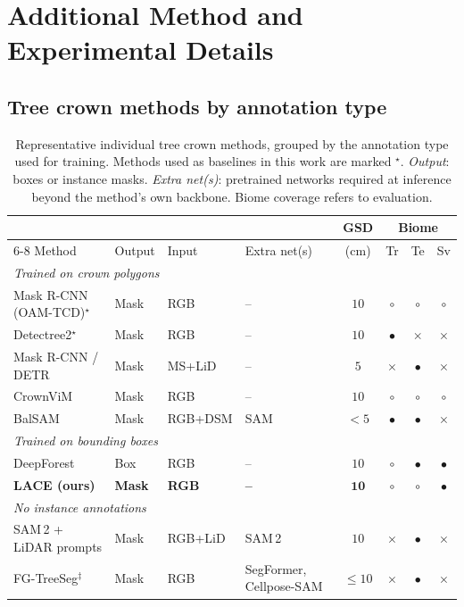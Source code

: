 \documentclass[remotesensing,article,submit,moreauthors]{Definitions/mdpi}
\providecommand{\cmark}{$\bullet$}
\providecommand{\omark}{$\circ$}
\providecommand{\xmark}{$\times$}
\begin{document}
\appendixstart
\appendix
\section{Additional Method and Experimental Details}
\label{app:details}

\subsection{Tree crown methods by annotation type}
\label{app:gap}

\begin{table}[H]
\centering\footnotesize
\setlength{\tabcolsep}{3.2pt}
\renewcommand{\arraystretch}{1.15}
\caption{Representative individual tree crown methods, grouped by the annotation type used for training. Methods used as baselines in this work are marked $^{\star}$. \emph{Output}: boxes or instance masks. \emph{Extra net(s)}: pretrained networks required at inference beyond the method's own backbone. Biome coverage refers to evaluation.}
\label{tab:gap}
\begin{tabular}{@{}llllcccc@{}}
\toprule
 & & & & GSD & \multicolumn{3}{c}{Biome} \\
\cmidrule(l){6-8}
Method & Output & Input & Extra net(s) & (cm) & Tr & Te & Sv \\
\midrule
\multicolumn{8}{l}{\textit{Trained on crown polygons}} \\
Mask R-CNN (OAM-TCD)$^{\star}$ \cite{oamtcd} & Mask & RGB & -- & $10$ & \omark & \omark & \omark \\
Detectree2$^{\star}$ \cite{ball2023} & Mask & RGB & -- & $10$ & \cmark & \xmark & \xmark \\
Mask R-CNN / DETR \cite{dersch2023} & Mask & MS+LiD & -- & $5$ & \xmark & \cmark & \xmark \\
CrownViM \cite{crownvim} & Mask & RGB & -- & $10$ & \omark & \omark & \omark \\
BalSAM \cite{teng2025} & Mask & RGB+DSM & SAM & $<5$ & \cmark & \cmark & \xmark \\
\midrule
\multicolumn{8}{l}{\textit{Trained on bounding boxes}} \\
DeepForest \cite{weinstein2020} & Box & RGB & -- & $10$ & \omark & \cmark & \cmark \\
\rowcolor{black!8}
\textbf{LACE (ours)} & \textbf{Mask} & \textbf{RGB} & \textbf{--} & $\mathbf{10}$ & \omark & \omark & \cmark \\
\midrule
\multicolumn{8}{l}{\textit{No instance annotations}} \\
SAM\,2 + LiDAR prompts \cite{sam2lidar} & Mask & RGB+LiD & SAM\,2 & $10$ & \xmark & \cmark & \xmark \\
FG-TreeSeg$^{\ddagger}$ \cite{fgtreeseg} & Mask & RGB & SegFormer, Cellpose-SAM & $\leq 10$ & \xmark & \cmark & \xmark \\
\bottomrule
\end{tabular}


\end{table}
\end{document}
